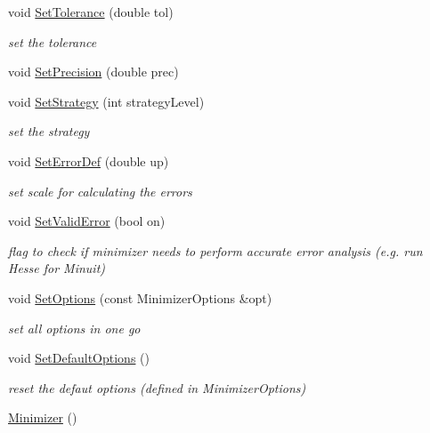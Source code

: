 \begin{DoxyCompactItemize}
void \mbox{\hyperlink{classROOT_1_1Math_1_1Minimizer_a5b7ee47a24b2412801654b8cde2c9b4f}{Set\+Tolerance}} (double tol)
\begin{DoxyCompactList}\small\item\em set the tolerance \end{DoxyCompactList}\item 
void \mbox{\hyperlink{classROOT_1_1Math_1_1Minimizer_a96160fe12f3cddf6ca0668ddb4a585bc}{Set\+Precision}} (double prec)
\item 
void \mbox{\hyperlink{classROOT_1_1Math_1_1Minimizer_a86a1145e00a7912ac061bad0e11b6c0b}{Set\+Strategy}} (int strategy\+Level)
\begin{DoxyCompactList}\small\item\em set the strategy \end{DoxyCompactList}\item 
void \mbox{\hyperlink{classROOT_1_1Math_1_1Minimizer_a24e7d646b58b9d5d2778c7c0399677da}{Set\+Error\+Def}} (double up)
\begin{DoxyCompactList}\small\item\em set scale for calculating the errors \end{DoxyCompactList}\item 
void \mbox{\hyperlink{classROOT_1_1Math_1_1Minimizer_a31289e6911a86aba956d0050cee2555b}{Set\+Valid\+Error}} (bool on)
\begin{DoxyCompactList}\small\item\em flag to check if minimizer needs to perform accurate error analysis (e.\+g. run Hesse for Minuit) \end{DoxyCompactList}\item 
void \mbox{\hyperlink{classROOT_1_1Math_1_1Minimizer_ac1546eeefbfb78bcfaf6d06cfde227c5}{Set\+Options}} (const Minimizer\+Options \&opt)
\begin{DoxyCompactList}\small\item\em set all options in one go \end{DoxyCompactList}\item 
void \mbox{\hyperlink{classROOT_1_1Math_1_1Minimizer_a4811690d47537dbc0ab09d50d57ce34f}{Set\+Default\+Options}} ()
\begin{DoxyCompactList}\small\item\em reset the defaut options (defined in Minimizer\+Options) \end{DoxyCompactList}\item 
\mbox{\hyperlink{classROOT_1_1Math_1_1Minimizer_a6981643dac29da36280b24d32b6d3140}{Minimizer}} ()

\end{DoxyCompactItemize}
